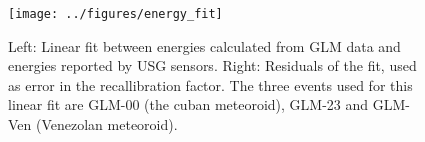 \begin{figure}
  \centering
  \texttt{[image: ../figures/energy\_fit]}
  \caption{Left: Linear fit between energies calculated from GLM data and energies reported by USG sensors. Right: Residuals of the fit, used as error in the recallibration factor. The three events used for this linear fit are GLM-00 (the cuban meteoroid), GLM-23 and GLM-Ven (Venezolan meteoroid).}
  \label{fig:lin_fit}
\end{figure}


